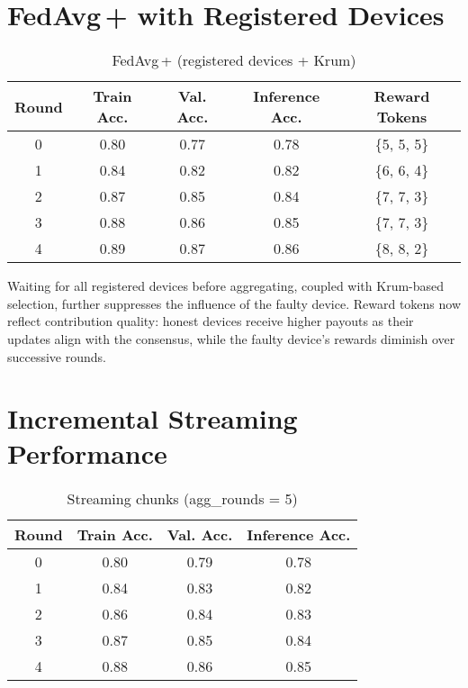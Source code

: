 \section{FedAvg\,+ with Registered Devices}

\begin{table}[h!]
    \centering
    \caption{FedAvg\,+ (registered devices + Krum)}
    \label{tab:fedavg_plus}
    \begin{tabular}{c c c c c}
        \toprule
        \textbf{Round} & \textbf{Train Acc.} & \textbf{Val. Acc.} & \textbf{Inference Acc.} & \textbf{Reward Tokens} \\
        \midrule
        0 & 0.80 & 0.77 & 0.78 & \{5, 5, 5\} \\
        1 & 0.84 & 0.82 & 0.82 & \{6, 6, 4\} \\
        2 & 0.87 & 0.85 & 0.84 & \{7, 7, 3\} \\
        3 & 0.88 & 0.86 & 0.85 & \{7, 7, 3\} \\
        4 & 0.89 & 0.87 & 0.86 & \{8, 8, 2\} \\
        \bottomrule
    \end{tabular}
\end{table}

Waiting for all registered devices before aggregating, coupled with Krum-based selection, further suppresses the influence of the faulty device. Reward tokens now reflect contribution quality: honest devices receive higher payouts as their updates align with the consensus, while the faulty device’s rewards diminish over successive rounds.

\section{Incremental Streaming Performance}

\begin{table}[h!]
    \centering
    \caption{Streaming chunks (agg\_rounds = 5)}
    \label{tab:streaming_chunks}
    \begin{tabular}{c c c c}
        \toprule
        \textbf{Round} & \textbf{Train Acc.} & \textbf{Val. Acc.} & \textbf{Inference Acc.} \\
        \midrule
        0 & 0.80 & 0.79 & 0.78 \\
        1 & 0.84 & 0.83 & 0.82 \\
        2 & 0.86 & 0.84 & 0.83 \\
        3 & 0.87 & 0.85 & 0.84 \\
        4 & 0.88 & 0.86 & 0.85 \\
        \bottomrule
    \end{tabular}
\end{table}

